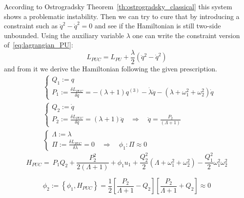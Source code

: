 According to Ostrogradsky Theorem~\ref{th:ostrogradsky_classical} this system
shows a problematic instability. Then we can try to cure that by introducing a
constraint such as $\ddot{q}^2 - \dot{q}^2 = 0$ and see if the Hamiltonian is
still two-side unbounded. Using the auxiliary variable $\lambda$ one can write
the constraint version of~\eqref{eq:lagrangian_PU}:
\begin{equation} \label{eq:lagrangian_PUC}
  L_{PUC} = L_{PU} + \frac{\lambda}{2} \left(\ddot{q}^2 - \dot{q}^2\right)
\end{equation}
and from it we derive the Hamiltonian following the given prescription.
\begin{align*}
  & \begin{cases}
    Q_1 := q \\
    P_1 := \frac{\delta L_{PUC}}{\delta \dot{q}} =
        - (\lambda + 1) q^{(3)} - \dot{\lambda}\ddot{q}
        - (\lambda + \omega_1^2 + \omega_2^2)\dot{q}
  \end{cases} \\
  & \begin{cases}
    Q_2 := \dot{q} \\
    P_2 := \frac{\delta L_{PUC}}{\delta \ddot{q}} =
        (\lambda + 1) \ddot{q}
        \quad  \Rightarrow \quad \ddot{q} = \frac{P_2}{(\Lambda + 1)}
  \end{cases} \\
  & \begin{cases}
    \Lambda := \lambda \\
    \Pi := \frac{\delta L_{PUC}}{\delta \lambda} = 0
        \quad  \Rightarrow \quad \phi_1: \Pi \approx 0
  \end{cases}
\end{align*}
\begin{equation} \label{eq:ham_PUC_with_aux_vars}
   H_{PUC} =\ P_1 Q_2 + \frac{P_2^2}{2(\Lambda + 1)} + \phi_1 u_1
  + \frac{Q_2^2}{2} \left(\Lambda + \omega_1^2 + \omega_2^2 \right)
  - \frac{Q_1^2}{2} \omega_1^2 \omega_2^2
\end{equation}

\begin{equation} \label{eq:secondary_constraint_PU}
  \phi_2 :=
  \left\{ \phi_1, H_{PUC} \right\} =
  \frac{1}{2} \left[ \frac{P_2}{\Lambda + 1} - Q_2 \right]
  \left[ \frac{P_2}{\Lambda + 1} + Q_2 \right]
  \approx 0
\end{equation}

